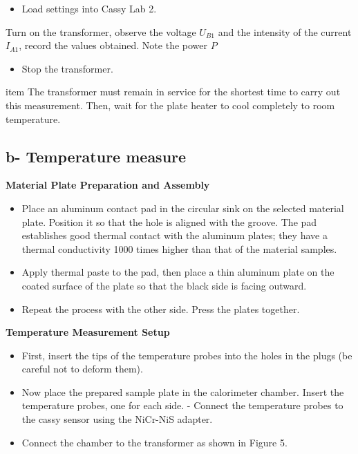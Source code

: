 \documentclass[12pt,a4paper,twoside]{article}
\begin{document}
\begin{itemize}
    \item Load settings into Cassy Lab 2.
\end{itemize}

Turn on the transformer, observe the voltage $U_{B1}$ and the intensity of the current $I_{A1}$, record the values obtained. Note the power $P$

\begin{itemize}
    \item Stop the transformer.
\end{itemize}

\begin{block}[warning]
item The transformer must remain in service for the shortest time to carry out this measurement. Then, wait for the plate heater to cool completely to room temperature.
\end{block}

\subsection*{b- Temperature measure}

\textbf{Material Plate Preparation and Assembly}

\begin{itemize}
    \item Place an aluminum contact pad in the circular sink on the selected material plate. Position it so that the hole is aligned with the groove. The pad establishes good thermal contact with the aluminum plates; they have a thermal conductivity 1000 times higher than that of the material samples.
    
    \item Apply thermal paste to the pad, then place a thin aluminum plate on the coated surface of the plate so that the black side is facing outward.
    
    \item Repeat the process with the other side. Press the plates together.
\end{itemize}

\textbf{Temperature Measurement Setup}

\begin{itemize}
    \item First, insert the tips of the temperature probes into the holes in the plugs (be careful not to deform them).
    
    \item Now place the prepared sample plate in the calorimeter chamber. Insert the temperature probes, one for each side. - Connect the temperature probes to the cassy sensor using the NiCr-NiS adapter.
    
    \item Connect the chamber to the transformer as shown in Figure 5.
\end{itemize}
\end{document}
